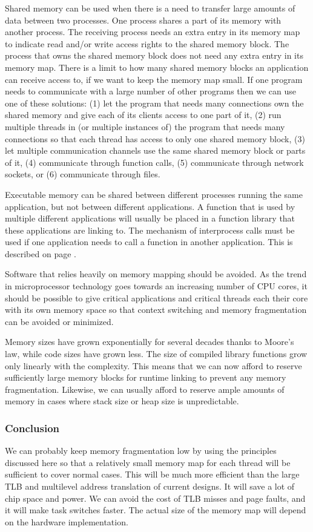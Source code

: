 \documentclass[forwardcom.tex]{subfiles}
\begin{document}
\label{sharedMemory} Shared memory can be used when there is a need to transfer large amounts of data between two processes. One process shares a part of its memory with another process. The receiving process needs an extra entry in its memory map to indicate read and/or write access rights to the shared memory block. The process that owns the shared memory block does not need any extra entry in its memory map. There is a limit to how many shared memory blocks an application can receive access to, if we want to keep the memory map small. If one program needs to communicate with a large number of other programs then we can use one of these solutions: (1) let the program that needs many connections own the shared memory and give each of its clients access to one part of it, (2) run multiple threads in (or multiple instances of) the program that needs many connections so that each thread has access to only one shared memory block, (3) let multiple communication channels use the same shared memory block or parts of it, (4) communicate through function calls, (5) communicate through network sockets, or (6) communicate through files. 
\vv

Executable memory can be shared between different processes running the same application, but not between different applications. A function that is used by multiple different applications will usually be placed in a function library that these applications are linking to. 
The mechanism of interprocess calls must be used if one application needs to call a function in another application. This is described on page \pageref{interProcessCalls}. 
\vv

Software that relies heavily on memory mapping should be avoided. As the trend in microprocessor technology goes towards an increasing number of CPU cores, it should be possible to give critical applications and critical threads each their core with its own memory space so that context switching and memory fragmentation can be avoided or minimized.
\vv

Memory sizes have grown exponentially for several decades thanks to Moore's law, while code sizes have grown less. The size of compiled library functions grow only linearly with the complexity. This means that we can now afford to reserve sufficiently large memory blocks for runtime linking to prevent any memory fragmentation. Likewise, we can usually afford to reserve ample amounts of memory in cases where stack size or heap size is unpredictable.
\vv


\subsubsection{Conclusion} \label{MemoryManagementConclusion}
We can probably keep memory fragmentation low by using the principles discussed here so that a relatively small memory map for each thread will be sufficient to cover normal cases. This will be much more efficient than the large TLB and multilevel address translation of current designs. It will save a lot of chip space and power.  We can avoid the cost of TLB misses and page faults, and it will make task switches faster. The actual size of the memory map will depend on the hardware implementation.
\vv
\end{document}

